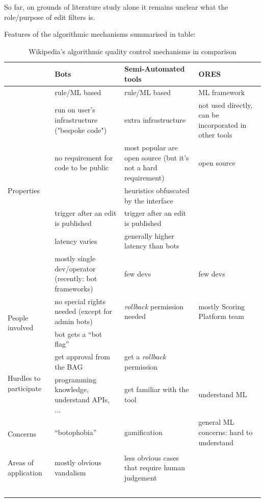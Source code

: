So far, on grounds of literature study alone it remains unclear what the role/purpose of edit filters is.

Features of the algorithmic mechanisms summarised in table:
\begin{landscape}
    \begin{longtable}{ | p{4cm} | p{5cm} | p{5cm} | p{5cm} | }
    \hline
               & Bots & Semi-Automated tools & ORES \\
    \hline
    \multirow{7}{*}{Properties} & rule/ML based & rule/ML based & ML framework \\
                               & run on user's infrastructure ("bespoke code") & extra infrastructure & not used directly, can be incorporated in other tools \\
                               & no requirement for code to be public & most popular are open source (but it's not a hard requirement) & open source \\
                               & & heuristics obfuscated by the interface & \\
                               & trigger after an edit is published & trigger after an edit is published & \\
                               & latency varies & generally higher latency than bots & \\
                               & mostly single dev/operator (recently: bot frameworks) & few devs & few devs \\
    \hline
    \multirow{2}{*}{People involved} & no special rights needed (except for admin bots) & \emph{rollback} permission needed & mostly Scoring Platform team \\
                                     & bot gets a ``bot flag'' & & \\
    \hline
        \multirow{2}{*}{Hurdles to participate} & get approval from the BAG & get a \emph{rollback} permission& \\
                                            & programming knowledge, understand APIs, ... & get familiar with the tool & understand ML \\
    \hline
        \multirow{2}{*}{Concerns} & ``botophobia'' & gamification & general ML concerns: hard to understand \\
                                  & & & \\
    \hline
        Areas of application & mostly obvious vandalism & less obvious cases that require human judgement & \\
    \hline
    \caption{Wikipedia's algorithmic quality control mechanisms in comparison}~\label{table:mechanisms-comparison-literature}
\end{longtable}
\end{landscape}
